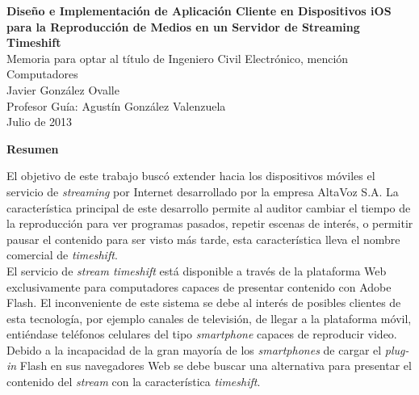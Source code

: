 \newpage
\thispagestyle{empty}
\begin{center}
 \Large \textbf{Diseño e Implementación de Aplicación Cliente en Dispositivos iOS para la Reproducción de Medios en un Servidor de Streaming Timeshift}\\

\normalsize Memoria para optar al título de Ingeniero Civil Electrónico, mención Computadores \\
\normalsize Javier González Ovalle \\
\normalsize Profesor Guía: Agustín González Valenzuela \\
\normalsize Julio de 2013 %

\Large \textbf{Resumen}

\end{center}
\normalsize


El objetivo de este trabajo buscó extender hacia los dispositivos móviles el servicio de \textit{streaming} por Internet desarrollado por la empresa AltaVoz S.A. La característica principal de este desarrollo permite al auditor cambiar el tiempo de la reproducción para ver programas pasados, repetir escenas de interés, o permitir pausar el contenido para ser visto más tarde, esta característica lleva el nombre comercial de \textit{timeshift}.\\


El servicio de \textit{stream timeshift} está disponible a través de la plataforma Web exclusivamente para computadores capaces de presentar contenido con Adobe Flash. El inconveniente de este sistema se debe al interés de posibles clientes de esta tecnología, por ejemplo canales de televisión, de llegar a la plataforma móvil, entiéndase teléfonos celulares del tipo \textit{smartphone} capaces de reproducir video. Debido a la incapacidad de la gran mayoría de los \textit{smartphones} de cargar el \textit{plug-in} Flash en sus navegadores Web se debe buscar una alternativa para presentar el contenido del \textit{stream} con la característica \textit{timeshift}.
\\

